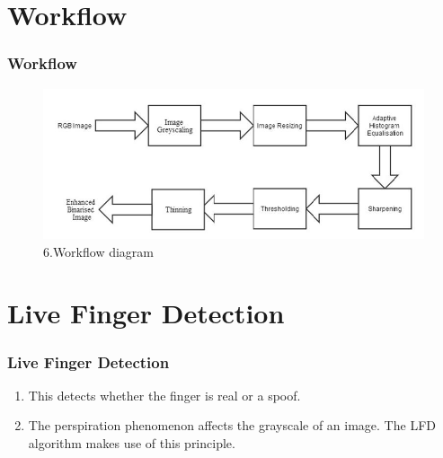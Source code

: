 \documentclass[12pt]{beamer}
\begin{document}
\section{Workflow}
\begin{frame}[c]
\frametitle{Workflow}
\begin{figure}
 \centering
 \vskip-20pt
 \includegraphics[width=12cm]{./wf.jpg}
 \caption{6.Workflow diagram}
\end{figure}
\end{frame}

\section{Live Finger Detection}
\begin{frame}[c]
\frametitle{Live Finger Detection}
\begin{enumerate}
\item \vskip-60pt This detects whether the finger is real or a spoof.
\item The perspiration phenomenon affects the grayscale of an image. The LFD algorithm makes use of this principle.
\end{enumerate}
\end{frame}
\end{document}
